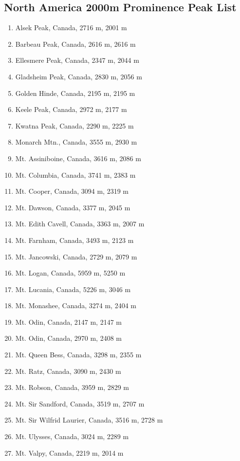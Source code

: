 \documentclass[10pt,twocolumn,letterpaper]{article}
\begin{document}
\subsection{North America 2000m Prominence Peak List}
\begin{flushleft}
\begin{enumerate}
    \item Alsek Peak, Canada, 2716 m, 2001 m
    \item Barbeau Peak, Canada, 2616 m, 2616 m
    \item Ellesmere Peak, Canada, 2347 m, 2044 m
    \item Gladsheim Peak, Canada, 2830 m, 2056 m
    \item Golden Hinde, Canada, 2195 m, 2195 m
    \item Keele Peak, Canada, 2972 m, 2177 m
    \item Kwatna Peak, Canada, 2290 m, 2225 m
    \item Monarch Mtn., Canada, 3555 m, 2930 m
    \item Mt. Assiniboine, Canada, 3616 m, 2086 m
    \item Mt. Columbia, Canada, 3741 m, 2383 m
    \item Mt. Cooper, Canada, 3094 m, 2319 m
    \item Mt. Dawson, Canada, 3377 m, 2045 m
    \item Mt. Edith Cavell, Canada, 3363 m, 2007 m
    \item Mt. Farnham, Canada, 3493 m, 2123 m
    \item Mt. Jancowski, Canada, 2729 m, 2079 m
    \item Mt. Logan, Canada, 5959 m, 5250 m
    \item Mt. Lucania, Canada, 5226 m, 3046 m
    \item Mt. Monashee, Canada, 3274 m, 2404 m
    \item Mt. Odin, Canada, 2147 m, 2147 m
    \item Mt. Odin, Canada, 2970 m, 2408 m
    \item Mt. Queen Bess, Canada, 3298 m, 2355 m
    \item Mt. Ratz, Canada, 3090 m, 2430 m
    \item Mt. Robson, Canada, 3959 m, 2829 m
    \item Mt. Sir Sandford, Canada, 3519 m, 2707 m
    \item Mt. Sir Wilfrid Laurier, Canada, 3516 m, 2728 m
    \item Mt. Ulysses, Canada, 3024 m, 2289 m
    \item Mt. Valpy, Canada, 2219 m, 2014 m

\end{enumerate}
\end{flushleft}
\end{document}

